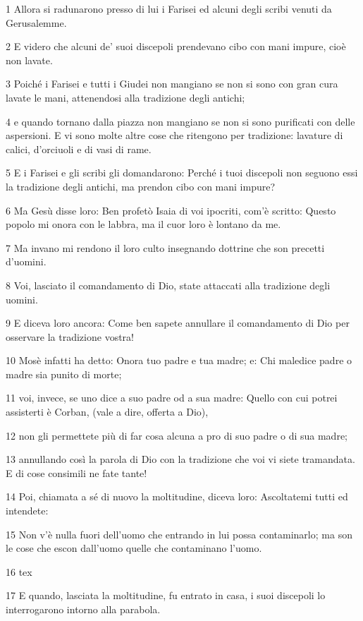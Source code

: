 \par 1 Allora si radunarono presso di lui i Farisei ed alcuni degli scribi venuti da Gerusalemme.
\par 2 E videro che alcuni de' suoi discepoli prendevano cibo con mani impure, cioè non lavate.
\par 3 Poiché i Farisei e tutti i Giudei non mangiano se non si sono con gran cura lavate le mani, attenendosi alla tradizione degli antichi;
\par 4 e quando tornano dalla piazza non mangiano se non si sono purificati con delle aspersioni. E vi sono molte altre cose che ritengono per tradizione: lavature di calici, d'orciuoli e di vasi di rame.
\par 5 E i Farisei e gli scribi gli domandarono: Perché i tuoi discepoli non seguono essi la tradizione degli antichi, ma prendon cibo con mani impure?
\par 6 Ma Gesù disse loro: Ben profetò Isaia di voi ipocriti, com'è scritto: Questo popolo mi onora con le labbra, ma il cuor loro è lontano da me.
\par 7 Ma invano mi rendono il loro culto insegnando dottrine che son precetti d'uomini.
\par 8 Voi, lasciato il comandamento di Dio, state attaccati alla tradizione degli uomini.
\par 9 E diceva loro ancora: Come ben sapete annullare il comandamento di Dio per osservare la tradizione vostra!
\par 10 Mosè infatti ha detto: Onora tuo padre e tua madre; e: Chi maledice padre o madre sia punito di morte;
\par 11 voi, invece, se uno dice a suo padre od a sua madre: Quello con cui potrei assisterti è Corban, (vale a dire, offerta a Dio),
\par 12 non gli permettete più di far cosa alcuna a pro di suo padre o di sua madre;
\par 13 annullando così la parola di Dio con la tradizione che voi vi siete tramandata. E di cose consimili ne fate tante!
\par 14 Poi, chiamata a sé di nuovo la moltitudine, diceva loro: Ascoltatemi tutti ed intendete:
\par 15 Non v'è nulla fuori dell'uomo che entrando in lui possa contaminarlo; ma son le cose che escon dall'uomo quelle che contaminano l'uomo.
\par 16 tex
\par 17 E quando, lasciata la moltitudine, fu entrato in casa, i suoi discepoli lo interrogarono intorno alla parabola.
